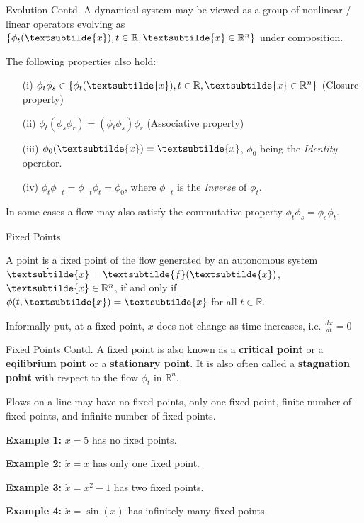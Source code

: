 \documentclass[18pt]{beamer}
\begin{document}
\begin{frame}{Evolution Contd.}
    A dynamical system may be viewed as a group of nonlinear / linear operators evolving as $\{\phi_t(\textsubtilde{x}), t \in \mathbb{R}, \textsubtilde{x} \in \mathbb{R}^{n} \}$ under composition. 
    \pause{}

    The following properties also hold:
    \pause{}
    \begin{enumerate}
        \item[(i)] $\phi_t\phi_s \in \{\phi_t(\textsubtilde{x}), t \in \mathbb{R}, \textsubtilde{x} \in \mathbb{R}^{n}\}$ (Closure property)
        \pause{}
        \item[(ii)] $\phi_t(\phi_s\phi_r) = (\phi_t\phi_s)\phi_r$ (Associative property)
        \pause{}
    \item[(iii)] $\phi_0(\textsubtilde{x}) = \textsubtilde{x}$, $\phi_0$ being the \textit{Identity} operator.
        \pause{}
    \item[(iv)] $\phi_t\phi_{-t} = \phi_{-t}\phi_t = \phi_0$, where $\phi_{-t}$ is the \textit{Inverse} of $\phi_t$.
    \end{enumerate}

    \pause{}

    In some cases a flow may also satisfy the commutative property $\phi_t\phi_s = \phi_s\phi_t$.
\end{frame}

\begin{frame}{Fixed Points}
    \begin{definition}
        A point is a fixed point of the flow generated by an autonomous system $\dot{\textsubtilde{x}} = \textsubtilde{f} (\textsubtilde{x})$, $\textsubtilde{x} \in \mathbb{R}^{n}$, if and only if $\phi(t, \textsubtilde{x}) = \textsubtilde{x}$ for all $t \in \mathbb{R}$.
    \end{definition}
    \pause{}
    Informally put, at a fixed point, $x$ does not change as time increases, i.e. $\frac{dx}{dt} = 0$
\end{frame}

\begin{frame}{Fixed Points Contd.}
    A fixed point is also known as a \textbf{critical point} or a \textbf{eqilibrium point} or a \textbf{stationary point}. It is also often called a \textbf{stagnation point} with respect to the flow $\phi_t$ in $\mathbb{R}^{n}$.
    \pause{}

    Flows on a line may have no fixed points, only one fixed point, finite number of fixed points, and infinite number of fixed points.
    \pause{}

    \textbf{Example 1:} $\dot{x} = 5$ has no fixed points.
    \pause{}

    \textbf{Example 2:} $\dot{x} = x$ has only one fixed point.
    \pause{}

    \textbf{Example 3:} $\dot{x} = x^{2} - 1$ has two fixed points.
    \pause{}

    \textbf{Example 4:} $\dot{x} = \sin(x)$ has infinitely many fixed points.
\end{frame}
\end{document}

